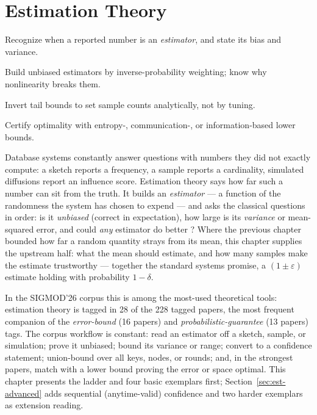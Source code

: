 \chapter{Estimation Theory}
\setcounter{section}{-1}   %
\label{ch:est}

\begin{objectives}
\item Recognize when a reported number is an \emph{estimator}, and state its bias and variance.
\item Build unbiased estimators by inverse-probability weighting; know why nonlinearity breaks them.
\item Invert tail bounds to set sample counts analytically, not by tuning.
\item Certify optimality with entropy-, communication-, or information-based lower bounds.
\end{objectives}

Database systems constantly answer questions with numbers they did not exactly compute: a
sketch reports a frequency, a sample reports a cardinality, simulated diffusions report an
influence score. Estimation theory says how far such a number can sit from the truth. It
builds an \emph{estimator} --- a function of the randomness the
system has chosen to expend --- and asks the classical questions in order: is it
\emph{unbiased} (correct in expectation), how large is its \emph{variance} or mean-squared
error, and could \emph{any} estimator do better \citep{estimation-theory-bg1,
estimation-theory-bg2}? Where the previous chapter bounded how far a random quantity strays
from its mean, this chapter supplies the upstream half: what the mean should estimate, and how
many samples make the estimate trustworthy --- together the standard systems promise, a
$(1\pm\varepsilon)$ estimate holding with probability $1-\delta$.

In the SIGMOD'26 corpus this is among the most-used theoretical tools: estimation theory is
tagged in 28 of the 228 tagged papers, the most frequent companion of the
\emph{error-bound} (16 papers) and \emph{probabilistic-guarantee} (13 papers) tags. The
corpus workflow is constant: read an estimator off a sketch, sample, or simulation; prove
it unbiased; bound its variance or range; convert to a confidence statement; union-bound
over all keys, nodes, or rounds; and, in the strongest papers, match with a lower bound
proving the error or space optimal. This chapter presents the ladder and four basic
exemplars first; Section~\ref{sec:est-advanced} adds sequential (anytime-valid)
confidence and two harder exemplars as extension reading.

